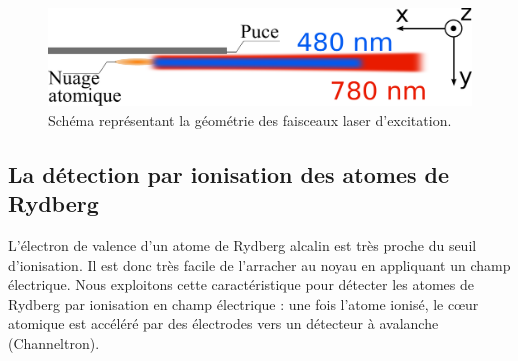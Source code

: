 %
\begin{figure}[!h]
\centering
\includegraphics[width=.8\linewidth]{figures/lasers_excit}
\caption[Faisceaux laser pour l'excitation des Rydberg]{Schéma représentant la géométrie des faisceaux laser d'excitation.
}
\label{fig:lasers_excit}
\end{figure}

		
	\subsection{La détection par ionisation des atomes de Rydberg}\label{subsec:detection}
\noindent L'électron de valence d'un atome de Rydberg alcalin est très proche du seuil d'ionisation.
Il est donc très facile de l'arracher au noyau en appliquant un champ électrique.
Nous exploitons cette caractéristique pour détecter les atomes de Rydberg par ionisation en champ électrique :
une fois l'atome ionisé, le c\oe ur atomique est accéléré par des électrodes vers un détecteur à avalanche (Channeltron).


